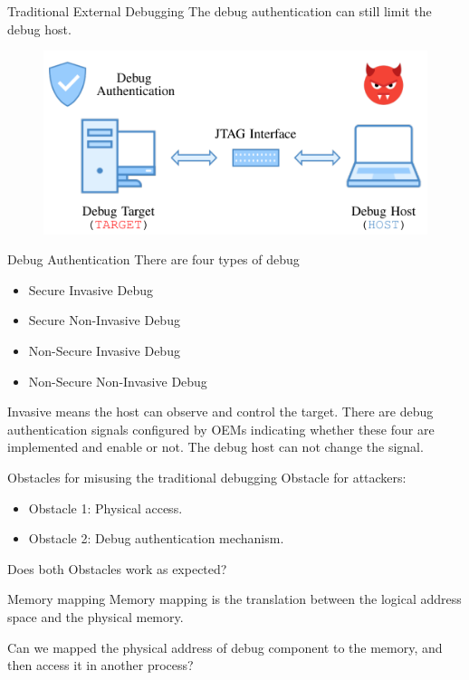 \documentclass{beamer}
\begin{document}
\begin{frame}{Traditional External Debugging}
    The debug authentication can still limit the debug host.
    \begin{figure}
        \centering
        \includegraphics[scale=.40]{SUSTech-Beamer-Theme/pic/nonsecure_external_debug2.png}
        \label{fig:my_label}
    \end{figure}
\end{frame}

\begin{frame}{Debug Authentication}
    There are four types of debug
    \begin{itemize}
        \item Secure Invasive Debug
        \item Secure Non-Invasive Debug
        \item Non-Secure Invasive Debug
        \item Non-Secure Non-Invasive Debug
    \end{itemize} 
    Invasive means the host can observe and control the target.
    There are debug authentication signals configured by OEMs indicating whether these four are implemented and enable or not. The debug host can not change the signal.
\end{frame}

\begin{frame}{Obstacles for misusing the traditional debugging}
    Obstacle for attackers:
    \begin{itemize}
        \item Obstacle 1: Physical access.
        \item Obstacle 2: Debug authentication mechanism.
    \end{itemize}
    Does both Obstacles work as expected?
\end{frame}

\begin{frame}{Memory mapping}
    Memory mapping is the translation between the logical address space and the physical memory.
    
    Can we mapped the physical address of debug component to the memory, and then access it in another process?
\end{frame}
\end{document}

